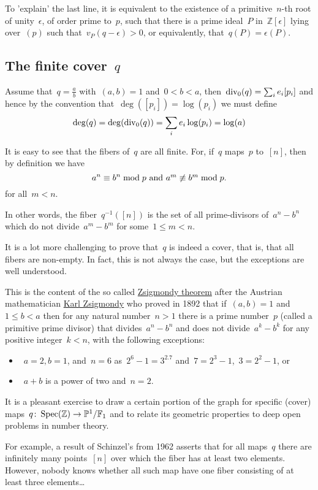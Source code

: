 To 'explain' the last line, it is equivalent to the existence of a primitive~$n$-th root of unity~$\epsilon$, of order prime to~$p$, such that there is a prime ideal~$P$ in~$\mathbb{Z}[\epsilon]$ lying over~$(p)$ such that~$v_P(q-\epsilon) > 0$, or equivalently, that~$q(P)=\epsilon(P)$.

\subsection{The finite cover~$q$}

Assume that~$q = \frac{a}{b}$ with~$(a,b)=1$ and~$0 < b < a$, then~$\operatorname{div}_0(q) = \sum_i e_i [p_i]$ and hence by the convention that~$\deg([p_i]) = \log(p_i)$ we must define
\begin{equation}
  \deg(q) = \deg(\operatorname{div}_0(q)) = \sum_i e_i \log(p_i) = \log(a)
\end{equation}

It is easy to see that the fibers of~$q$ are all finite. For, if~$q$ maps~$p$ to~$[n]$, then by definition we have
\begin{equation}
  a^n \equiv b^n\bmod p$ and~$a^m \not\equiv b^m\bmod p.
\end{equation}
for all~$m < n$.

In other words, the fiber~$q^{-1}([n])$ is the set of all prime-divisors of~$a^n-b^n$ which do not divide~$a^m-b^m$ for some~$1 \leq m < n$.

It is a lot more challenging to prove that~$q$ is indeed a cover, that is, that all fibers are non-empty. In fact, this is not always the case, but the exceptions are well understood.

This is the content of the so called \href{http://en.wikipedia.org/wiki/Zsigmondy's_theorem}{Zsigmondy theorem} after the Austrian mathematician \href{http://en.wikipedia.org/wiki/Karl_Zsigmondy}{Karl Zsigmondy} who proved in 1892 that if~$(a,b)=1$ and~$1 \leq b < a$ then for any natural number~$n > 1$ there is a prime number~$p$ (called a primitive prime divisor) that divides~$a^n-b^n$ and does not divide~$a^k-b^k$ for any positive integer~$k < n$, with the following exceptions:
\begin{itemize}
  \item~$a = 2, b = 1$, and~$n = 6$  as~$2^6-1=3^2.7$ and~$7=2^3-1$,~$3=2^2-1$, or
  \item~$a+b$ is a power of two and~$n=2$.
\end{itemize}

It is a pleasant exercise to draw a certain portion of the graph for specific (cover) maps~$q\colon\operatorname{Spec}(\mathbb{Z}) \to \mathbb{P}^1 / \mathbb{F}_1$ and to relate its geometric properties to deep open problems in number theory.

For example, a result of Schinzel's from 1962 asserts that for all maps~$q$ there are infinitely many points~$[n]$ over which the fiber has at least two elements. However, nobody knows whether all such map have one fiber consisting of at least three elements\ldots
